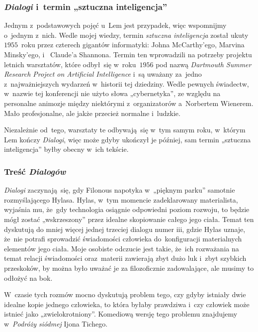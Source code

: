 \documentclass[10pt,t]{beamer}
\begin{document}
\begin{frame}
  \frametitle{\textit{Dialogi} i~termin „sztuczna
    inteligencja”}


  Jednym z~podstawowych pojęć u~Lem jest przypadek, więc wspomnijmy o~jednym
  z~nich. Wedle mojej wiedzy, termin \textit{sztuczna inteligencja} został
  ukuty $1955$~roku przez czterech gigantów informatyki:
  {Johna McCarthy’ego},
  {Marvina Minsky’ego},
  i~
  {Claude’a Shannona}. Termin ten wprowadzili na potrzeby projektu letnich
  warsztatów, które odbył~się w~roku~$1956$ pod nazwą
  {\textit{Dartmouth Summer Research Project on Artificial Intelligence}}
  i~są uważany za~jedno z~najważniejszych wydarzeń w~historii tej
  dziedziny. Wedle pewnych świadectw, w~nazwie tej konferencji nie użyto
  słowa „cybernetyka”, ze względu na personalne animozje między niektórymi
  z~organizatorów a~Norbertem Wienerem. Mało profesjonalne, ale jakże
  przecież normalne i~ludzkie.

  Niezależnie od~tego, warsztaty te odbywają~się w~tym samym roku, w~którym
  Lem kończy \textit{Dialogi}, więc może gdyby ukończył je później,
  sam termin „sztuczna inteligencja” byłby obecny w~ich tekście.

\end{frame}





\begin{frame}
  \frametitle{Treść \textit{Dialogów}}


  \textit{Dialogi} zaczynają~się, gdy Filonous napotyka w~„pięknym parku”
  samotnie rozmyślającego Hylasa. Hylas, w~tym momencie zadeklarowany
  materialista, wyjaśnia mu, że~gdy technologia osiągnie odpowiedni
  poziom rozwoju, to będzie mógł zostać „wskrzeszony” przez idealne
  skopiowanie całego jego ciała. Temat ten dyskutują do mniej więcej
  jednej trzeciej dialogu numer iii, gdzie Hylas uznaje, że~nie potrafi
  sprowadzić świadomości człowieka do~konfiguracji materialnych elementów
  jego ciała. Moje osobiste odczucie jest takie, że~ich rozważania na temat
  relacji świadomości oraz~materii zawierają zbyt dużo luk i~zbyt szybkich
  przeskoków, by można było uważać je za filozoficznie zadowalające, ale
  musimy to odłożyć na bok.

  W~czasie tych rozmów mocno dyskutują problem tego, czy gdyby istniały
  dwie idealne kopie jednego człowieka, to która byłaby prawdziwa
  i~czy człowiek może istnieć jako „zwielokrotniony”. Komediową wersję
  tego problemu znajdujemy w~\textit{Podróży siódmej} Ijona Tichego.

\end{frame}
\end{document}
